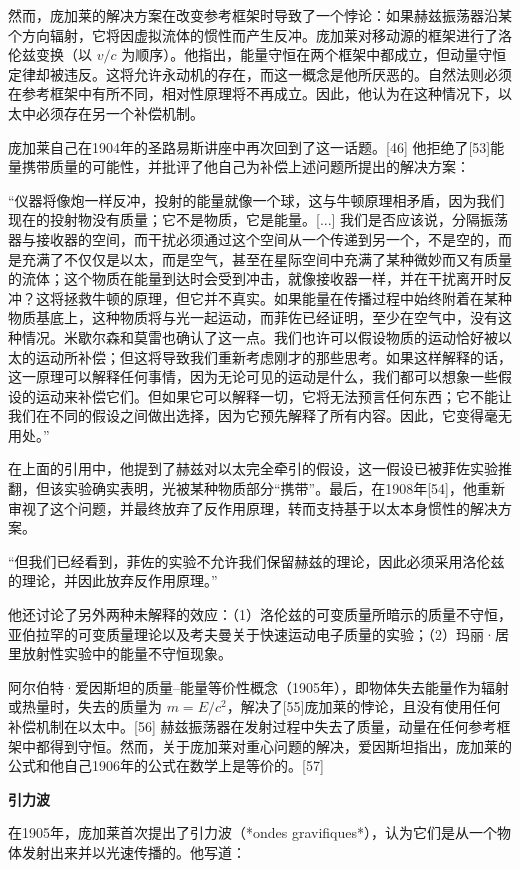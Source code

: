然而，庞加莱的解决方案在改变参考框架时导致了一个悖论：如果赫兹振荡器沿某个方向辐射，它将因虚拟流体的惯性而产生反冲。庞加莱对移动源的框架进行了洛伦兹变换（以 \( v/c \) 为顺序）。他指出，能量守恒在两个框架中都成立，但动量守恒定律却被违反。这将允许永动机的存在，而这一概念是他所厌恶的。自然法则必须在参考框架中有所不同，相对性原理将不再成立。因此，他认为在这种情况下，以太中必须存在另一个补偿机制。

庞加莱自己在1904年的圣路易斯讲座中再次回到了这一话题。[46] 他拒绝了[53]能量携带质量的可能性，并批评了他自己为补偿上述问题所提出的解决方案：

“仪器将像炮一样反冲，投射的能量就像一个球，这与牛顿原理相矛盾，因为我们现在的投射物没有质量；它不是物质，它是能量。[...] 我们是否应该说，分隔振荡器与接收器的空间，而干扰必须通过这个空间从一个传递到另一个，不是空的，而是充满了不仅仅是以太，而是空气，甚至在星际空间中充满了某种微妙而又有质量的流体；这个物质在能量到达时会受到冲击，就像接收器一样，并在干扰离开时反冲？这将拯救牛顿的原理，但它并不真实。如果能量在传播过程中始终附着在某种物质基底上，这种物质将与光一起运动，而菲佐已经证明，至少在空气中，没有这种情况。米歇尔森和莫雷也确认了这一点。我们也许可以假设物质的运动恰好被以太的运动所补偿；但这将导致我们重新考虑刚才的那些思考。如果这样解释的话，这一原理可以解释任何事情，因为无论可见的运动是什么，我们都可以想象一些假设的运动来补偿它们。但如果它可以解释一切，它将无法预言任何东西；它不能让我们在不同的假设之间做出选择，因为它预先解释了所有内容。因此，它变得毫无用处。”

在上面的引用中，他提到了赫兹对以太完全牵引的假设，这一假设已被菲佐实验推翻，但该实验确实表明，光被某种物质部分“携带”。最后，在1908年[54]，他重新审视了这个问题，并最终放弃了反作用原理，转而支持基于以太本身惯性的解决方案。

“但我们已经看到，菲佐的实验不允许我们保留赫兹的理论，因此必须采用洛伦兹的理论，并因此放弃反作用原理。”

他还讨论了另外两种未解释的效应：（1）洛伦兹的可变质量所暗示的质量不守恒，亚伯拉罕的可变质量理论以及考夫曼关于快速运动电子质量的实验；（2）玛丽·居里放射性实验中的能量不守恒现象。

阿尔伯特·爱因斯坦的质量–能量等价性概念（1905年），即物体失去能量作为辐射或热量时，失去的质量为 \( m = E/c^2 \)，解决了[55]庞加莱的悖论，且没有使用任何补偿机制在以太中。[56] 赫兹振荡器在发射过程中失去了质量，动量在任何参考框架中都得到守恒。然而，关于庞加莱对重心问题的解决，爱因斯坦指出，庞加莱的公式和他自己1906年的公式在数学上是等价的。[57]

\textbf{引力波} 

在1905年，庞加莱首次提出了引力波（*ondes gravifiques*），认为它们是从一个物体发射出来并以光速传播的。他写道：

